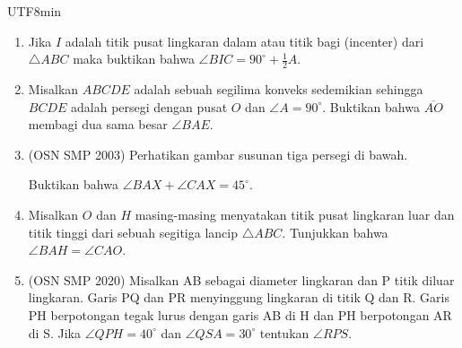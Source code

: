 \documentclass[12pt]{scrartcl}
\begin{document}
\begin{CJK*}{UTF8}{min}
\begin{enumerate}
\section{Angle Chasing}
    \item Jika $I$ adalah titik pusat lingkaran dalam atau titik bagi (incenter) dari $\triangle ABC$ maka buktikan bahwa
        $\angle BIC = 90^\circ + \frac{1}{2}A.$

    \item Misalkan $ABCDE$ adalah sebuah segilima konveks sedemikian sehingga $BCDE$ adalah persegi dengan pusat $O$ dan $\angle A = 90^\circ$. Buktikan bahwa $\overline{AO}$ membagi dua sama besar $\angle BAE$.

    \item (OSN SMP 2003) Perhatikan gambar susunan tiga persegi di bawah. 
    
    Buktikan bahwa $\angle BAX+\angle CAX=45^{\circ}$.
    

    \item Misalkan $O$ dan $H$ masing-masing menyatakan titik pusat lingkaran luar dan titik tinggi dari sebuah segitiga lancip $\triangle ABC$. Tunjukkan bahwa $\angle BAH = \angle CAO$.

    \item (OSN SMP 2020) Misalkan AB sebagai diameter lingkaran dan P titik diluar lingkaran. Garis PQ dan PR menyinggung lingkaran di titik Q dan R. Garis PH berpotongan tegak lurus dengan garis AB di H dan PH berpotongan AR di S. Jika $\angle QPH=40^{\circ}$ dan $\angle QSA=30^{\circ}$ tentukan $\angle RPS$.
        

\end{enumerate}
\end{CJK*}
\end{document}
